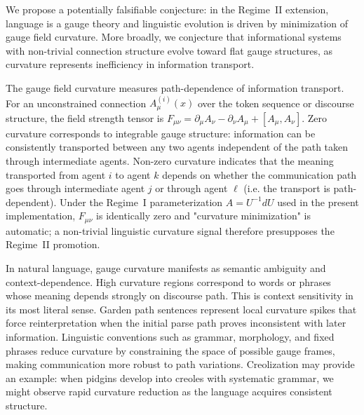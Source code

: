 \documentclass[11pt]{article}
\begin{document}
We propose a potentially falsifiable conjecture: in the Regime~II extension, language is a gauge theory and linguistic evolution is driven by minimization of gauge field curvature. More broadly, we conjecture that informational systems with non-trivial connection structure evolve toward flat gauge structures, as curvature represents inefficiency in information transport.

The gauge field curvature measures path-dependence of information transport. For an unconstrained connection $A_\mu^{(i)}(x)$ over the token sequence or discourse structure, the field strength tensor is $F_{\mu\nu} = \partial_\mu A_\nu - \partial_\nu A_\mu + [A_\mu, A_\nu]$. Zero curvature corresponds to integrable gauge structure: information can be consistently transported between any two agents independent of the path taken through intermediate agents. Non-zero curvature indicates that the meaning transported from agent $i$ to agent $k$ depends on whether the communication path goes through intermediate agent $j$ or through agent $\ell$ (i.e. the transport is path-dependent). Under the Regime~I parameterization $A = U^{-1}dU$ used in the present implementation, $F_{\mu\nu}$ is identically zero and "curvature minimization" is automatic; a non-trivial linguistic curvature signal therefore presupposes the Regime~II promotion.

In natural language, gauge curvature manifests as semantic ambiguity and context-dependence. High curvature regions correspond to words or phrases whose meaning depends strongly on discourse path. This is context sensitivity in its most literal sense. Garden path sentences represent local curvature spikes that force reinterpretation when the initial parse path proves inconsistent with later information. Linguistic conventions such as grammar, morphology, and fixed phrases reduce curvature by constraining the space of possible gauge frames, making communication more robust to path variations. Creolization may provide an example: when pidgins develop into creoles with systematic grammar, we might observe rapid curvature reduction as the language acquires consistent structure.
\end{document}
